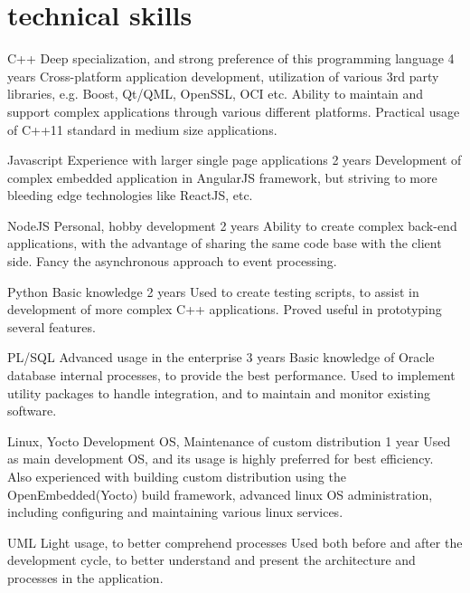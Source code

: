 \documentclass[]{friggeri-cv} %
\begin{document}

\newpage

\section{technical skills}
\begin{entrylist}
\entry
{C++}
{Deep specialization, and strong preference of this programming language}
{4 years}
{Cross-platform application development, utilization of various 3rd party libraries, e.g. Boost, Qt/QML, OpenSSL, OCI etc. Ability to maintain and support complex applications through various different platforms. Practical usage of C++11 standard in medium size applications.}

\entry
{Javascript}
{Experience with larger single page applications}
{2 years}
{Development of complex embedded application in AngularJS framework, but striving to more bleeding edge technologies like ReactJS, etc.}

\entry
{NodeJS}
{Personal, hobby development}
{2 years}
{Ability to create complex back-end applications, with the advantage of sharing the same code base with the client side. Fancy the asynchronous approach to event processing.}

\entry
{Python}
{Basic knowledge}
{2 years}
{Used to create testing scripts, to assist in development of more complex C++ applications. Proved useful in prototyping several features.}

\entry
{PL/SQL}
{Advanced usage in the enterprise}
{3 years}
{Basic knowledge of Oracle database internal processes, to provide the best performance. Used to implement utility packages to handle integration, and to maintain and monitor existing software.}

\entry
{Linux, Yocto}
{Development OS, Maintenance of custom distribution}
{1 year}
{Used as main development OS, and its usage is highly preferred for best efficiency.
\\
Also experienced with building custom distribution using the OpenEmbedded(Yocto) build framework,
advanced linux OS administration, including configuring and maintaining various linux services.
}

\entry
{UML}
{Light usage, to better comprehend processes}
{}
{Used both before and after the development cycle, to better understand and present the architecture and processes in the application.}

\end{entrylist}
\end{document}
